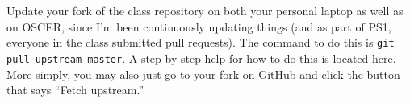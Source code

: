 \documentclass[12pt,english]{exam}
\begin{document}
\begin{questions}
\question Update your fork of the class repository on both your personal laptop as well as on OSCER, since I'm been continuously updating things (and as part of PS1, everyone in the class submitted pull requests). The command to do this is \texttt{git pull upstream master}. A step-by-step help for how to do this is located \href{https://help.github.com/articles/syncing-a-fork/}{here}. More simply, you may also just go to your fork on GitHub and click the button that says ``Fetch upstream.''

\end{questions}
\end{document}
